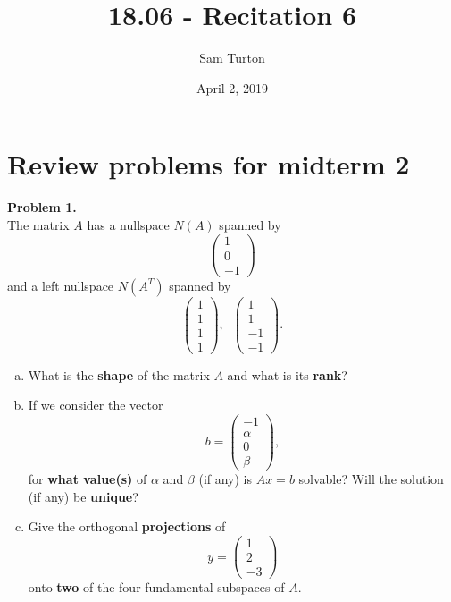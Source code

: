 \documentclass[11pt]{article}
\title{18.06 - Recitation 6}
\author{Sam Turton}
\date{April 2, 2019}
\begin{document}
\maketitle

\section{Review problems for midterm 2}

\noindent \textbf{Problem 1.}\\
The matrix $A$ has a nullspace $N(A)$ spanned by 
$$\begin{pmatrix} 1 \\ 0 \\ -1 \end{pmatrix}$$
and a left nullspace $N(A^T)$ spanned by
$$\begin{pmatrix} 1 \\ 1 \\ 1 \\ 1 \end{pmatrix}, \;\; \begin{pmatrix} 1 \\ 1 \\ -1 \\ -1 \end{pmatrix}.$$
\begin{enumerate}[(a)]
\item What is the \textbf{shape} of the matrix $A$ and what is its \textbf{rank}?
\item If we consider the vector 
$$b = \begin{pmatrix} -1 \\ \alpha \\ 0 \\ \beta \end{pmatrix},$$
for \textbf{what value(s)} of $\alpha$ and $\beta$ (if any) is $Ax = b$ solvable? Will the solution (if any) be \textbf{unique}?
\item Give the orthogonal \textbf{projections} of 
$$y = \begin{pmatrix} 1 \\ 2 \\ -3 \end{pmatrix}$$
onto \textbf{two} of the four fundamental subspaces of $A$. 
\end{enumerate}

\newpage
\end{document}
